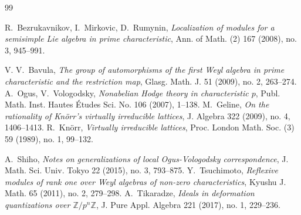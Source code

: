 \documentclass[12pt,letterpaper]{amsart}
\theoremstyle{plain}
\theoremstyle{definition}
\begin{document}
\begin{thebibliography}{99}

R.~Bezrukavnikov, I.~Mirkovic, D.~Rumynin, {\em Localization of modules for a semisimple Lie algebra in prime characteristic},
 Ann. of Math. (2) 167 (2008), no. 3, 945--991.

V. V.~Bavula, {\em The group of automorphisms of the first Weyl algebra in prime characteristic and the restriction map}, Glasg. Math. J. 51 (2009), no. 2, 263--274.
A.~Ogus, V.~Vologodsky, {\em Nonabelian Hodge theory in characteristic $p$},
Publ. Math. Inst. Hautes Études Sci. No. 106 (2007), 1--138. 
M.~Geline, 
{\em On the rationality of Knörr's virtually irreducible lattices}, 
J. Algebra 322 (2009), no. 4, 1406--1413.
R.~Kn\"{o}rr,
{\em Virtually irreducible lattices},
Proc. London Math. Soc. (3) 59 (1989), no. 1, 99--132.

A.~Shiho, {\em Notes on generalizations of local Ogus-Vologodsky
correspondence}, J. Math. Sci. Univ. Tokyo 22 (2015), no. 3, 793--875.
 Y.~Tsuchimoto, {\em Reflexive modules of rank one over Weyl algebras of non-zero characteristics}, Kyushu J. Math. 65 (2011), no. 2, 279--298.
A.~Tikaradze, {\em Ideals in deformation quantizations over $\mathbb{Z}/p^n\mathbb{Z}$},
J. Pure Appl. Algebra 221 (2017), no. 1, 229--236. 
\end{thebibliography}
\end{document}
